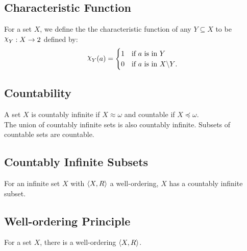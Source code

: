 \subsection{Characteristic Function}

For a set $X$, we define the the characteristic function of any $Y \subseteq X$
to be $\varchi_Y : X \to 2$ defined by: \begin{align*}
    \varchi_Y(a) = \begin{cases}
        1 & \text{if $a$ is in $Y$} \\
        0 & \text{if $a$ is in $X \backslash Y$}.
    \end{cases}
\end{align*}

\subsection{Countability}

A set $X$ is countably infinite if $X \approx \omega$ and countable if
$X \preceq \omega$. 
\\[\baselineskip]
The union of countably infinite sets is also countably infinite.
Subsets of countable sets are countable.

\subsection{Countably Infinite Subsets}

For an infinite set $X$ with $\langle X, R \rangle$ a well-ordering, $X$ has a
countably infinite subset.

\subsection{Well-ordering Principle}

For a set $X$, there is a well-ordering $\langle X, R \rangle$. 
